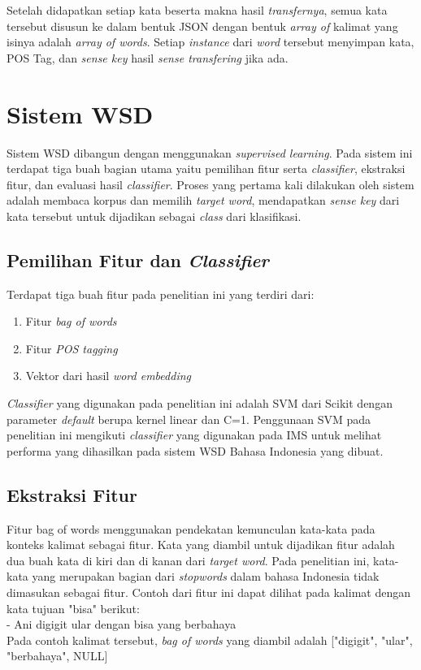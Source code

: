 Setelah didapatkan setiap kata beserta makna hasil \textit{transfernya}, semua kata tersebut disusun ke dalam bentuk JSON dengan bentuk \textit{array of} kalimat yang isinya adalah \textit{array of words}. Setiap \textit{instance} dari \textit{word} tersebut menyimpan kata, POS Tag, dan \textit{sense key} hasil \textit{sense transfering} jika ada.
\section{Sistem WSD}
Sistem WSD dibangun dengan menggunakan \textit{supervised learning}. Pada sistem ini terdapat tiga buah bagian utama yaitu pemilihan fitur serta \textit{classifier}, ekstraksi fitur, dan evaluasi hasil \textit{classifier}. Proses yang pertama kali dilakukan oleh sistem adalah membaca korpus dan memilih \textit{target word}, mendapatkan \textit{sense key} dari kata tersebut untuk dijadikan sebagai \textit{class} dari klasifikasi. 

\subsection{Pemilihan Fitur dan \textit{Classifier}}
Terdapat tiga buah fitur pada penelitian ini yang terdiri dari:

\begin{enumerate}
	\item Fitur \textit{bag of words}
	\item Fitur \textit{POS tagging}
	\item Vektor dari hasil \textit{word embedding}
\end{enumerate}

\textit{Classifier} yang digunakan pada penelitian ini adalah SVM dari Scikit \citep{scikit-learn} dengan parameter \textit{default} berupa kernel linear dan C=1. Penggunaan SVM pada penelitian ini mengikuti \textit{classifier} yang digunakan pada IMS \cite{zhong2010makes} untuk melihat performa yang dihasilkan pada sistem WSD Bahasa Indonesia yang dibuat.

\subsection{Ekstraksi Fitur}
Fitur bag of words menggunakan pendekatan kemunculan kata-kata pada konteks kalimat sebagai fitur. Kata yang diambil untuk dijadikan fitur adalah dua buah kata di kiri dan di kanan dari \textit{target word}. Pada penelitian ini, kata-kata yang merupakan bagian dari \textit{stopwords} dalam bahasa Indonesia tidak dimasukan sebagai fitur. Contoh dari fitur ini dapat dilihat pada kalimat dengan kata tujuan "bisa" berikut:
\\
- Ani digigit ular dengan bisa yang berbahaya
\\
Pada contoh kalimat tersebut, \textit{bag of words} yang diambil adalah ["digigit", "ular", "berbahaya", NULL]

